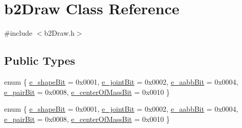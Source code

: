 \hypertarget{classb2Draw}{}\section{b2\+Draw Class Reference}
\label{classb2Draw}


{\ttfamily \#include $<$b2\+Draw.\+h$>$}

\subsection*{Public Types}
\begin{DoxyCompactItemize}
\item 
enum \{ \newline
\hyperlink{classb2Draw_a1ab40b2d49a84ff37701511d3060ff3eac617e88eae2b7890857d12b67cfd45ed}{e\+\_\+shape\+Bit} = 0x0001, 
\hyperlink{classb2Draw_a1ab40b2d49a84ff37701511d3060ff3eafcb7058ebcae22c25dd34c6d75dd90d7}{e\+\_\+joint\+Bit} = 0x0002, 
\hyperlink{classb2Draw_a1ab40b2d49a84ff37701511d3060ff3ea613d9a539ab829c1e5d682a7a34de3fb}{e\+\_\+aabb\+Bit} = 0x0004, 
\hyperlink{classb2Draw_a1ab40b2d49a84ff37701511d3060ff3ea1a23346db70a5aa83e3e6fffbd6b9d7b}{e\+\_\+pair\+Bit} = 0x0008, 
\newline
\hyperlink{classb2Draw_a1ab40b2d49a84ff37701511d3060ff3ea542b80153eca8bf44cad102af6a2bd2b}{e\+\_\+center\+Of\+Mass\+Bit} = 0x0010
 \}
\item 
enum \{ \newline
\hyperlink{classb2Draw_a1ab40b2d49a84ff37701511d3060ff3eac617e88eae2b7890857d12b67cfd45ed}{e\+\_\+shape\+Bit} = 0x0001, 
\hyperlink{classb2Draw_a1ab40b2d49a84ff37701511d3060ff3eafcb7058ebcae22c25dd34c6d75dd90d7}{e\+\_\+joint\+Bit} = 0x0002, 
\hyperlink{classb2Draw_a1ab40b2d49a84ff37701511d3060ff3ea613d9a539ab829c1e5d682a7a34de3fb}{e\+\_\+aabb\+Bit} = 0x0004, 
\hyperlink{classb2Draw_a1ab40b2d49a84ff37701511d3060ff3ea1a23346db70a5aa83e3e6fffbd6b9d7b}{e\+\_\+pair\+Bit} = 0x0008, 
\newline
\hyperlink{classb2Draw_a1ab40b2d49a84ff37701511d3060ff3ea542b80153eca8bf44cad102af6a2bd2b}{e\+\_\+center\+Of\+Mass\+Bit} = 0x0010
 \}
\end{DoxyCompactItemize}
